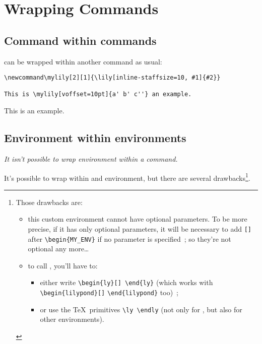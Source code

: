 \documentclass{lyluatexexample}
\begin{document}
\VerbatimFootnotes

\section*{Wrapping Commands}

\subsection*{Command within commands}

 can be wrapped within another command as usual:

\begin{verbatim}
\newcommand\mylily[2][1]{\lily[inline-staffsize=10, #1]{#2}}

This is \mylily[voffset=10pt]{a' b' c''} an example.
\end{verbatim}

\newcommand\mylily[2][1]{\lily[inline-staffsize=10, #1]{#2}}

This is \mylily[voffset=10pt]{a' b' c''} an example.\par

\subsection*{Environment within environments}

\emph{It isn't possible to wrap  environment within a command.}\par

It's possible to wrap  within and environment, but there are
several drawbacks\footnote{%
Those drawbacks are:
\begin{itemize}
  \item this custom environment cannot have optional parameters. To be more
  precise, if it has only optional parameters, it will be necessary to add \verb`[]`
  after \verb`\begin{MY_ENV}` if no parameter is specified ; so they're not
  optional any more…
  \item to call , you'll have to:
  \begin{itemize}
    \item either write \verb`\begin{ly}[] \end{ly}` (which works with
    \verb`\begin{lilypond}[]` \verb`\end{lilypond}` too) ;
    \item or use the \TeX\ primitives \verb`\ly \endly` (not only for ,
    but also for other environments).
  \end{itemize}
\end{itemize}%
}.
\end{document}
